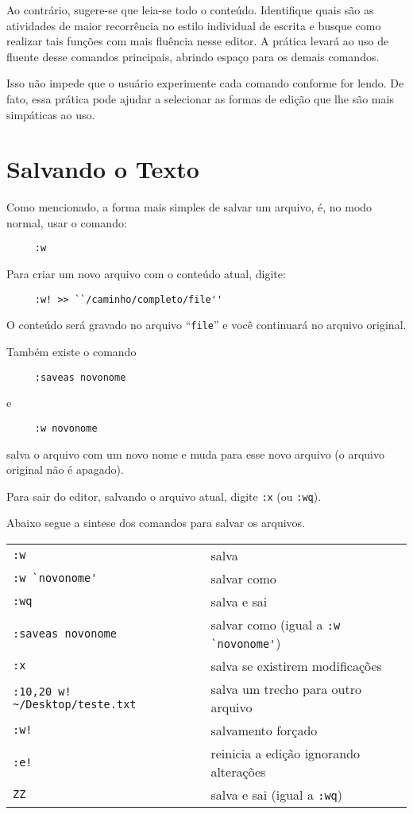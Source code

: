 Ao contrário, sugere-se que leia-se todo o conteúdo. Identifique 
quais são as atividades de maior recorrência no estilo individual de 
escrita e busque como realizar tais funções com mais fluência nesse
editor. A prática levará ao uso de fluente desse comandos principais,
abrindo espaço para os demais comandos.

Isso não impede que o usuário experimente cada comando conforme for lendo.
De fato, essa prática pode ajudar a selecionar as formas de edição que lhe
são mais simpáticas ao uso.

\section{Salvando o Texto}
\label{sec:Salvando}

Como mencionado, a forma mais simples de salvar um arquivo, é, 
no modo normal, usar o comando:
\begin{verbatim}
     :w
\end{verbatim}

Para criar um novo arquivo com o conteúdo atual, digite:
\begin{verbatim}
     :w! >> ``/caminho/completo/file''
\end{verbatim}
O conteúdo será gravado no arquivo ``{\tt file}'' e você continuará no
 arquivo original.

Também existe o comando

\begin{verbatim}
     :saveas novonome
\end{verbatim}

e

\begin{verbatim}
     :w novonome
\end{verbatim}
salva o arquivo com um novo nome e muda para esse novo arquivo (o arquivo
original não é apagado). 

Para sair do editor, salvando o arquivo atual, digite {\tt :x} (ou {\tt :wq}).

Abaixo segue a sintese dos comandos para salvar os arquivos.
\begin{table}[htb]\begin{center} \begin{tabular}{ll} \hline
     \verb|:w| & salva\\
     \verb|:w `novonome'| & salvar como\\
     \verb|:wq| & salva e sai\\
     \verb|:saveas novonome| & salvar como (igual a \verb|:w `novonome'|)\\
     \verb|:x| & salva se existirem modificações\\
     \verb|:10,20 w! ~/Desktop/teste.txt | & salva um trecho para outro arquivo\\
     \verb|:w!| & salvamento forçado\\
     \verb|:e!| & reinicia a edição ignorando alterações\\
     \verb|ZZ| & salva e sai (igual a \verb|:wq|)\\
\hline \end{tabular}\end{center}\end{table}


